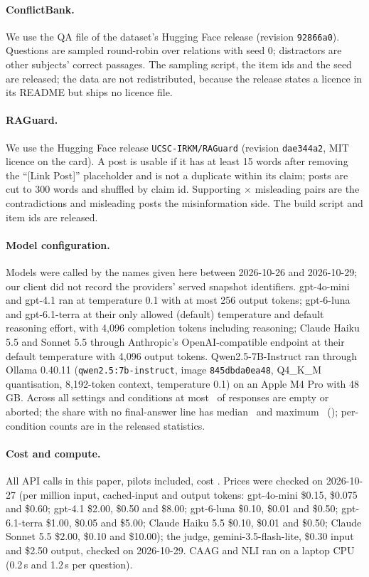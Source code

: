 \paragraph{ConflictBank.} We use the QA file of the dataset's Hugging Face release (revision \texttt{92866a0}). Questions are sampled round-robin over relations with seed 0; distractors are other subjects' correct passages. The
sampling script, the item ids and the seed are released; the data are not redistributed, because the release states
a licence in its README but ships no licence file.

\paragraph{RAGuard.} We use the Hugging Face release \texttt{UCSC-IRKM/RAGuard} (revision \texttt{dae344a2}, MIT
licence on the card). A post is usable if it has at least 15 words after removing the ``[Link Post]'' placeholder and is
not a duplicate within its claim; posts are cut to 300 words and shuffled by claim id. Supporting $\times$ misleading
pairs are the contradictions and misleading posts the misinformation side. The build script and item ids are
released.

\paragraph{Model configuration.} Models were called by the names given here between 2026-10-26 and 2026-10-29;
our client did not record the providers' served snapshot identifiers. gpt-4o-mini and gpt-4.1 ran at temperature 0.1
with at most 256 output tokens; gpt-6-luna and gpt-6.1-terra at their only allowed (default) temperature and default
reasoning effort, with 4,096 completion tokens including reasoning; Claude Haiku 5.5 and Sonnet 5.5 through
Anthropic's OpenAI-compatible endpoint at their default temperature with 4,096 output tokens. Qwen2.5-7B-Instruct ran
through Ollama 0.40.11 (\texttt{qwen2.5:7b-instruct}, image \texttt{845dbda0ea48}, Q4\_K\_M quantisation, 8,192-token
context, temperature 0.1) on an Apple M4 Pro with 48\,GB. Across all settings and conditions at most \truncMaxEmpty\ of
responses are empty or aborted; the share with no final-answer line has median \truncMedNoFinal\ and maximum
\truncMaxNoFinal\ (\truncMaxAt); per-condition counts are in the released statistics.

\paragraph{Cost and compute.} All API calls in this paper, pilots included, cost \totalSpend. Prices were checked on 2026-10-27 (per million input, cached-input and output tokens: gpt-4o-mini \$0.15, \$0.075 and \$0.60; gpt-4.1 \$2.00, \$0.50 and \$8.00; gpt-6-luna \$0.10, \$0.01 and \$0.50; gpt-6.1-terra \$1.00, \$0.05 and \$5.00; Claude Haiku 5.5 \$0.10, \$0.01 and
\$0.50; Claude Sonnet 5.5 \$2.00, \$0.10 and \$10.00); the judge, gemini-3.5-flash-lite, \$0.30 input and \$2.50 output, checked on 2026-10-29. CAAG and NLI ran on a
laptop CPU (0.2\,s and 1.2\,s per question).

